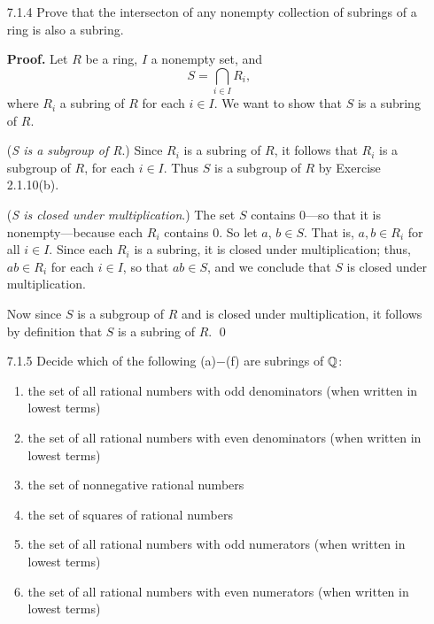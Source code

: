 \begin{enumerate}
      \textbf{Converse.} Let $R = \Q$ and $S = \Z$. The integer 2 is a unit in
      $\Q$ but not a unit in $\Z$. \qed
   \item[7.1.4]   Prove that the intersecton of any nonempty collection of
                  subrings of a ring is also a subring.

      \textbf{Proof.} Let $R$ be a ring, $I$ a nonempty set, and
      $$S = \bigcap_{i \in I} R_i,$$
      where $R_i$ a subring of $R$ for each $i \in I$. We want to show that $S$
      is a subring of $R$.

      (\textit{S is a subgroup of R}.) Since $R_i$ is a subring
      of $R$, it follows that $R_i$ is a subgroup of $R$, for each $i \in I$. 
      Thus $S$ is a subgroup of $R$ by Exercise 2.1.10(b).

      (\textit{S is closed under multiplication}.) The set $S$ contains 0---so
      that it is nonempty---because each $R_i$ contains 0. So let $a$,
      $b \in S$. That is, $a, b \in R_i$ for all $i \in I$. Since each $R_i$ is
      a subring, it is closed under multiplication; thus, $ab \in R_i$ for each
      $i \in I$, so that $ab \in S$, and we conclude that $S$ is closed under
      multiplication.

      Now since $S$ is a subgroup of $R$ and is closed under multiplication, it
      follows by definition that $S$ is a subring of $R$. \qed
   \item[7.1.5]   Decide which of the following (a)$-$(f) are subrings of $\Q$:
                  \begin{enumerate}
                     \item the set of all rational numbers with odd denominators
                           (when written in lowest terms)
                     \item the set of all rational numbers with even
                           denominators (when written in lowest terms)
                     \item the set of nonnegative rational numbers
                     \item the set of squares of rational numbers
                     \item the set of all rational numbers with odd numerators
                           (when written in lowest terms)
                     \item the set of all rational numbers with even numerators
                           (when written in lowest terms)
                  \end{enumerate}


\end{enumerate}

